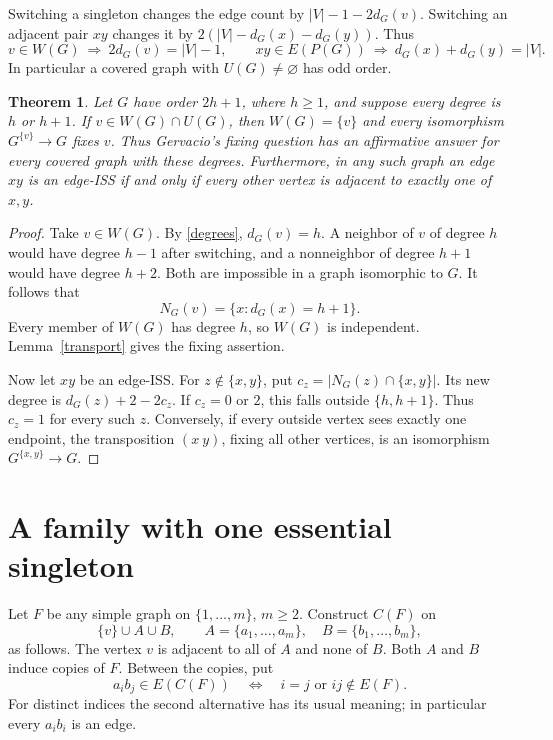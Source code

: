 \documentclass[11pt]{article}
\newtheorem{theorem}{Theorem}
\begin{document}
Switching a singleton changes the edge count by
$|V|-1-2d_G(v)$. Switching an adjacent pair $xy$ changes it by
$2(|V|-d_G(x)-d_G(y))$. Thus
\begin{equation}\label{degrees}
 v\in W(G)\ \Longrightarrow\ 2d_G(v)=|V|-1,
 \qquad xy\in E(P(G))\ \Longrightarrow\ d_G(x)+d_G(y)=|V|.
\end{equation}
In particular a covered graph with $U(G)\ne\varnothing$ has odd order.

\begin{theorem}\label{twolevels}
Let $G$ have order $2h+1$, where $h\geq1$, and suppose every degree is
$h$ or $h+1$. If $v\in W(G)\cap U(G)$, then $W(G)=\{v\}$ and every
isomorphism $G^{\{v\}}\to G$ fixes $v$. Thus Gervacio's fixing question
has an affirmative answer for every covered graph with these degrees.
Furthermore, in any such graph an edge $xy$ is an edge-ISS if and only if
every other vertex is adjacent to exactly one of $x,y$.
\end{theorem}
\begin{proof}
Take $v\in W(G)$. By \eqref{degrees}, $d_G(v)=h$. A neighbor of $v$
of degree $h$ would have degree $h-1$ after switching, and a nonneighbor
of degree $h+1$ would have degree $h+2$. Both are impossible in a graph
isomorphic to $G$. It follows that
\begin{equation}\label{neighbors}
 N_G(v)=\{x:d_G(x)=h+1\}.
\end{equation}
Every member of $W(G)$ has degree $h$, so $W(G)$ is independent.
Lemma~\ref{transport} gives the fixing assertion.

Now let $xy$ be an edge-ISS. For $z\notin\{x,y\}$, put
$c_z=|N_G(z)\cap\{x,y\}|$. Its new degree is
$d_G(z)+2-2c_z$. If $c_z=0$ or $2$, this falls outside $\{h,h+1\}$.
Thus $c_z=1$ for every such $z$. Conversely, if every outside vertex
sees exactly one endpoint, the transposition $(x\ y)$, fixing all
other vertices, is an isomorphism $G^{\{x,y\}}\to G$.
\end{proof}

\section{A family with one essential singleton}
Let $F$ be any simple graph on $\{1,\ldots,m\}$, $m\geq2$. Construct
$C(F)$ on
\[
 \{v\}\cup A\cup B,\qquad
 A=\{a_1,\ldots,a_m\},\quad B=\{b_1,\ldots,b_m\},
\]
as follows. The vertex $v$ is adjacent to all of $A$ and none of $B$.
Both $A$ and $B$ induce copies of $F$. Between the copies, put
\begin{equation}\label{cross}
 a_i b_j\in E(C(F))\quad\Longleftrightarrow\quad
 i=j\text{ or }ij\notin E(F).
\end{equation}
For distinct indices the second alternative has its usual meaning;
in particular every $a_i b_i$ is an edge.
\end{document}

